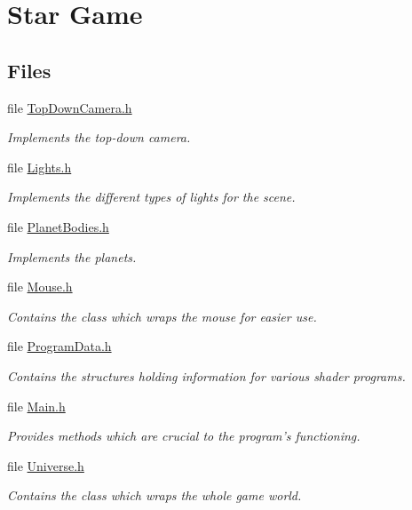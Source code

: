 \hypertarget{group__module___star_game}{\section{Star Game}
\label{group__module___star_game}
}
\subsection*{Files}
\begin{DoxyCompactItemize}
\item 
file \hyperlink{_top_down_camera_8h}{Top\-Down\-Camera.\-h}
\begin{DoxyCompactList}\small\item\em Implements the top-\/down camera. \end{DoxyCompactList}\item 
file \hyperlink{_lights_8h}{Lights.\-h}
\begin{DoxyCompactList}\small\item\em Implements the different types of lights for the scene. \end{DoxyCompactList}\item 
file \hyperlink{_planet_bodies_8h}{Planet\-Bodies.\-h}
\begin{DoxyCompactList}\small\item\em Implements the planets. \end{DoxyCompactList}\item 
file \hyperlink{_mouse_8h}{Mouse.\-h}
\begin{DoxyCompactList}\small\item\em Contains the class which wraps the mouse for easier use. \end{DoxyCompactList}\item 
file \hyperlink{_program_data_8h}{Program\-Data.\-h}
\begin{DoxyCompactList}\small\item\em Contains the structures holding information for various shader programs. \end{DoxyCompactList}\item 
file \hyperlink{_main_8h}{Main.\-h}
\begin{DoxyCompactList}\small\item\em Provides methods which are crucial to the program's functioning. \end{DoxyCompactList}\item 
file \hyperlink{_universe_8h}{Universe.\-h}
\begin{DoxyCompactList}\small\item\em Contains the class which wraps the whole game world. \end{DoxyCompactList}\item 

\end{DoxyCompactItemize}
